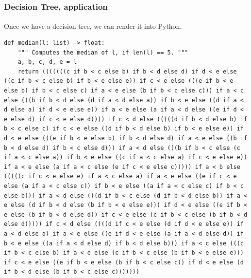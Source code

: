 \documentclass{beamer}                             %
\begin{document}
\begin{frame}[fragile]
\frametitle{Decision Tree, application}
\framesubtitle{}
Once we have a decision tree, we can render it into Python.
\begin{verbatim}
def median(l: list) -> float:
    """ Computes the median of l, if len(l) == 5. """
    a, b, c, d, e = l
    return (((((((c if b < c else b) if b < d else d) if d < e else ((c if b < c else b) if b < e else e)) if c < e else (((e if b < e else b) if b < c else c) if a < e else (b if b < c else c))) if a < c else (((b if b < d else (d if a < d else a)) if b < e else ((d if a < d else a) if d < e else e)) if a < e else (a if a < d else ((e if d < e else d) if c < e else d)))) if c < d else (((((d if b < d else b) if b < c else c) if c < e else ((d if b < d else b) if b < e else e)) if d < e else (((e if b < e else b) if b < d else d) if a < e else ((b if b < d else d) if b < c else d))) if a < d else (((b if b < c else (c if a < c else a)) if b < e else ((c if a < c else a) if c < e else e)) if a < e else (a if a < c else (e if c < e else c))))) if a < b else (((((c if c < e else e) if a < c else a) if a < e else ((e if c < e else (a if a < c else c)) if b < e else ((a if a < c else c) if b < c else b))) if a < d else (((d if b < c else (d if b < d else b)) if a < e else (d if b < d else (b if b < e else e))) if d < e else ((e if b < e else (b if b < d else d)) if c < e else (c if b < c else (b if b < d else d))))) if c < d else ((((d if c < e else (d if d < e else e)) if a < d else a) if a < e else ((e if d < e else (a if a < d else d)) if b < e else ((a if a < d else d) if b < d else b))) if a < c else (((c if b < c else b) if a < e else (c if b < c else (b if b < e else e))) if c < e else ((e if b < e else (b if b < c else c)) if d < e else (d if b < d else (b if b < c else c)))))))
\end{verbatim}
\end{frame}
\end{document}
